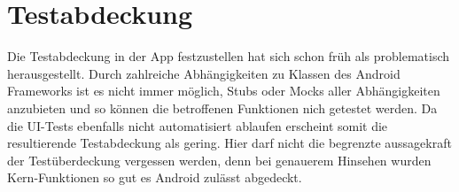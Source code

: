 \chapter{Testabdeckung}
Die Testabdeckung in der App festzustellen hat sich schon früh als problematisch herausgestellt. Durch zahlreiche Abhängigkeiten zu Klassen des Android Frameworks ist es nicht immer möglich, Stubs oder Mocks aller Abhängigkeiten anzubieten und so können die betroffenen Funktionen nich getestet werden. Da die UI-Tests ebenfalls nicht automatisiert ablaufen erscheint somit die resultierende Testabdeckung als gering. Hier darf nicht die begrenzte aussagekraft der Testüberdeckung vergessen werden, denn bei genauerem Hinsehen wurden Kern-Funktionen so gut es Android zulässt abgedeckt.